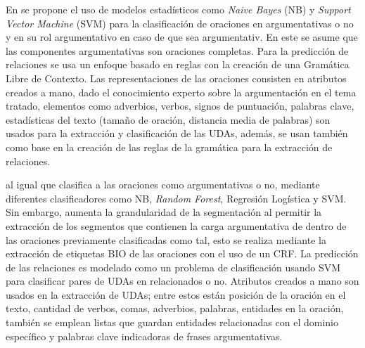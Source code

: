 En \textcite{palau2009argumentation} se propone
el uso de modelos estadísticos como \emph{Naive Bayes} (NB) y \emph{Support Vector Machine} (SVM) 
para la clasificación de 
oraciones en argumentativas o no y en su rol argumentativo en caso de que sea argumentativ. En este
se asume que las componentes argumentativas son oraciones completas. Para la predicción de relaciones
se usa un enfoque basado en reglas con la creación de una Gramática Libre de Contexto. Las representaciones
de las oraciones consisten en atributos creados a mano, dado el conocimiento experto sobre la argumentación
en el tema tratado, elementos como adverbios, verbos, signos de puntuación, palabras clave, estadísticas del texto
(tamaño de oración, distancia media de palabras) son usados para la extracción y clasificación de las UDAs, además,
se usan también como base en la creación de las reglas de la gramática para la extracción de relaciones.

\textcite{goudas2015argument} al igual que \textcite{palau2009argumentation} clasifica a las oraciones como
argumentativas o no, mediante diferentes clasificadores como NB, \emph{Random Forest}, Regresión
Logística y SVM. Sin embargo, \textcite{goudas2015argument} aumenta la grandularidad de la segmentación al permitir
la extracción de los segmentos que contienen la carga argumentativa de dentro de las oraciones previamente clasificadas
como tal, esto se realiza mediante la extracción de etiquetas BIO de las oraciones con el uso de un 
CRF. La predicción de las relaciones es modelado como un problema de clasificación
usando SVM para clasificar pares de UDAs en relacionados o no. Atributos creados a mano 
son usados en la extracción de UDAs; entre estos están posición de la oración en el texto, cantidad de verbos, comas, adverbios,
palabras, entidades en la oración, también se emplean listas que guardan entidades relacionadas con el dominio 
específico y palabras clave indicadoras de frases argumentativas. 

